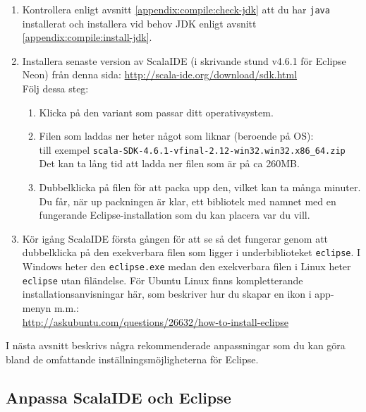 \begin{enumerate}
\item Kontrollera enligt avsnitt \ref{appendix:compile:check-jdk} att du har \texttt{java} installerat och installera vid behov JDK enligt avsnitt \ref{appendix:compile:install-jdk}.

\item Installera senaste version av ScalaIDE (i skrivande stund v4.6.1 för Eclipse Neon) från denna sida:  \url{http://scala-ide.org/download/sdk.html} \\
Följ dessa steg:
\begin{enumerate}
\item Klicka på den variant som passar ditt operativsystem.
\item Filen som laddas ner heter något som liknar (beroende på OS): \\ till exempel  \texttt{scala-SDK-4.6.1-vfinal-2.12-win32.win32.x86\_64.zip}
\\ Det kan ta lång tid att ladda ner filen som är på ca 260MB.

\item Dubbelklicka på filen för att packa upp den, vilket kan ta många minuter. Du får, när up	packningen är klar, ett bibliotek med namnet  med en fungerande Eclipse-installation som du kan placera var du vill.
\end{enumerate}

\item Kör igång ScalaIDE första gången för att se så det fungerar genom att dubbelklicka på den exekverbara filen som ligger i underbiblioteket \texttt{eclipse}. I Windows heter den \texttt{eclipse.exe} medan den exekverbara filen i Linux heter \texttt{eclipse} utan filändelse. För Ubuntu Linux finns kompletterande installationsanvisningar här, som beskriver hur du skapar en ikon i app-menyn m.m.:
\\ \url{http://askubuntu.com/questions/26632/how-to-install-eclipse}

\end{enumerate}

\noindent I nästa avsnitt beskrivs några rekommenderade anpassningar som du kan göra bland de omfattande inställningsmöjligheterna för Eclipse.


\subsection{Anpassa ScalaIDE och Eclipse}\label{subsection:appendix:ide:eclipse:tweaks}

